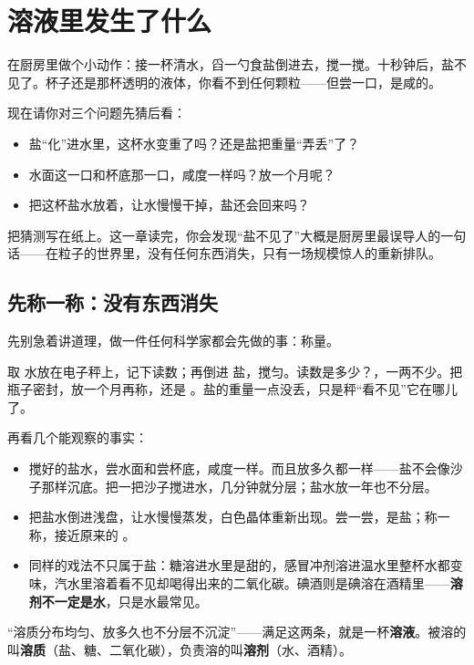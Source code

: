 \chapter{溶液里发生了什么}

\begin{kaichang}
在厨房里做个小动作：接一杯清水，舀一勺食盐倒进去，搅一搅。十秒钟后，盐不见了。杯子还是那杯透明的液体，你看不到任何颗粒——但尝一口，是咸的。

现在请你对三个问题先猜后看：
\begin{itemize}[itemsep=2pt]
\item 盐“化”进水里，这杯水变重了吗？还是盐把重量“弄丢”了？
\item 水面这一口和杯底那一口，咸度一样吗？放一个月呢？
\item 把这杯盐水放着，让水慢慢干掉，盐还会回来吗？
\end{itemize}

把猜测写在纸上。这一章读完，你会发现“盐不见了”大概是厨房里最误导人的一句话——在粒子的世界里，没有任何东西消失，只有一场规模惊人的重新排队。
\end{kaichang}

\section{先称一称：没有东西消失}

先别急着讲道理，做一件任何科学家都会先做的事：称量。

取  水放在电子秤上，记下读数；再倒进  盐，搅匀。读数是多少？，一两不少。把瓶子密封，放一个月再称，还是 。盐的重量一点没丢，只是秤“看不见”它在哪儿了。

再看几个能观察的事实：

\begin{itemize}[itemsep=2pt]
\item 搅好的盐水，尝水面和尝杯底，咸度一样。而且放多久都一样——盐不会像沙子那样沉底。把一把沙子搅进水，几分钟就分层；盐水放一年也不分层。
\item 把盐水倒进浅盘，让水慢慢蒸发，白色晶体重新出现。尝一尝，是盐；称一称，接近原来的 。
\item 同样的戏法不只属于盐：糖溶进水里是甜的，感冒冲剂溶进温水里整杯水都变味，汽水里溶着看不见却喝得出来的二氧化碳。碘酒则是碘溶在酒精里——\textbf{溶剂不一定是水}，只是水最常见。
\end{itemize}

“溶质分布均匀、放多久也不分层不沉淀”——满足这两条，就是一杯\textbf{溶液}。被溶的叫\textbf{溶质}（盐、糖、二氧化碳），负责溶的叫\textbf{溶剂}（水、酒精）。

